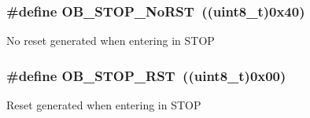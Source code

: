 \subsubsection[{O\+B\+\_\+\+S\+T\+O\+P\+\_\+\+No\+R\+S\+T}]{\setlength{\rightskip}{0pt plus 5cm}\#define O\+B\+\_\+\+S\+T\+O\+P\+\_\+\+No\+R\+S\+T~((uint8\+\_\+t)0x40)}\label{group___f_l_a_s_h___option___bytes__n_r_s_t___s_t_o_p_ga6762d6e4045fec58b49dfc03c1927d51}
No reset generated when entering in S\+T\+O\+P \hypertarget{group___f_l_a_s_h___option___bytes__n_r_s_t___s_t_o_p_gaef92c03b1f279c532bfa13d3bb074b57}{}
\subsubsection[{O\+B\+\_\+\+S\+T\+O\+P\+\_\+\+R\+S\+T}]{\setlength{\rightskip}{0pt plus 5cm}\#define O\+B\+\_\+\+S\+T\+O\+P\+\_\+\+R\+S\+T~((uint8\+\_\+t)0x00)}\label{group___f_l_a_s_h___option___bytes__n_r_s_t___s_t_o_p_gaef92c03b1f279c532bfa13d3bb074b57}
Reset generated when entering in S\+T\+O\+P 